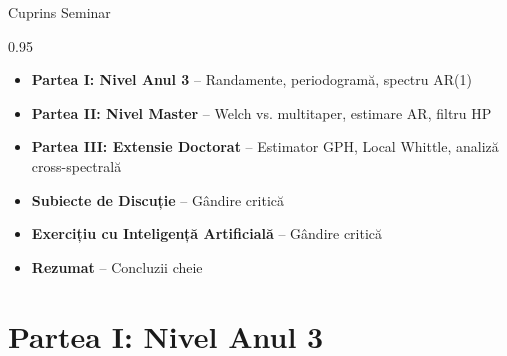 \documentclass[9pt, aspectratio=169, t]{beamer}
\subtitle{Seminar 12: Analiza Spectrală și Metode în Domeniul Frecvenței}
\begin{document}
{
\begin{frame}
    \titlepage
\end{frame}
}

\begin{frame}{Cuprins Seminar}
    \begin{cminipage}{0.95\textwidth}
    \begin{itemize}\setlength{\itemsep}{0pt}
        \item \textbf{Partea I: Nivel Anul 3} -- Randamente, periodogramă, spectru AR(1)
        \vspace{0.15cm}
        \item \textbf{Partea II: Nivel Master} -- Welch vs. multitaper, estimare AR, filtru HP
        \vspace{0.15cm}
        \item \textbf{Partea III: Extensie Doctorat} -- Estimator GPH, Local Whittle, analiză cross-spectrală
        \vspace{0.15cm}
        \item \textbf{Subiecte de Discuție} -- Gândire critică
        \vspace{0.15cm}
        \item \textbf{Exercițiu cu Inteligență Artificială} -- Gândire critică
        \vspace{0.15cm}
        \item \textbf{Rezumat} -- Concluzii cheie
    \end{itemize}
    \end{cminipage}
\end{frame}


\section{Partea I: Nivel Anul 3}
\end{document}
